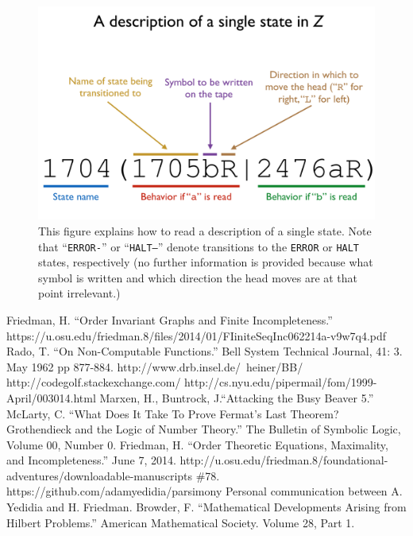 \documentclass[11pt]{article}
\begin{document}
\begin{appendices}
\begin{figure} 
\begin{center} 
\includegraphics[scale=0.4]{figs/syntax.png}
\caption{This figure explains how to read a description of a single state. Note that ``\texttt{ERROR-}'' or ``\texttt{HALT--}'' denote transitions to the \texttt{ERROR} or \texttt{HALT} states, respectively (no further information is provided because what symbol is written and which direction the head moves are at that point irrelevant.) \label{fig:syntax}} 
\end{center} 
\end{figure}



\end{appendices}

\begin{thebibliography}{100}
 Friedman, H. ``Order Invariant Graphs and Finite Incompleteness.'' https://u.osu.edu/friedman.8/files/2014/01/FIiniteSeqInc062214a-v9w7q4.pdf
 Rado, T. ``On Non-Computable Functions.'' 
Bell System Technical Journal, 41: 3. May 1962 pp 877-884.
 http://www.drb.insel.de/~heiner/BB/
 http://codegolf.stackexchange.com/
 http://cs.nyu.edu/pipermail/fom/1999-April/003014.html
 Marxen, H., Buntrock, J.``Attacking the Busy Beaver 5.'' 
 McLarty, C. ``What Does It Take To Prove Fermat's Last Theorem? Grothendieck and the Logic of Number Theory.'' The Bulletin of Symbolic Logic, Volume 00, Number 0.
 Friedman, H. ``Order Theoretic Equations, Maximality, and Incompleteness.'' June 7, 2014. http://u.osu.edu/friedman.8/foundational-adventures/downloadable-manuscripts \#78.
 https://github.com/adamyedidia/parsimony
 Personal communication between A. Yedidia and H. Friedman.
 Browder, F. ``Mathematical Developments Arising from Hilbert Problems.'' American Mathematical Society. Volume 28, Part 1.
\end{thebibliography}
\end{document}

